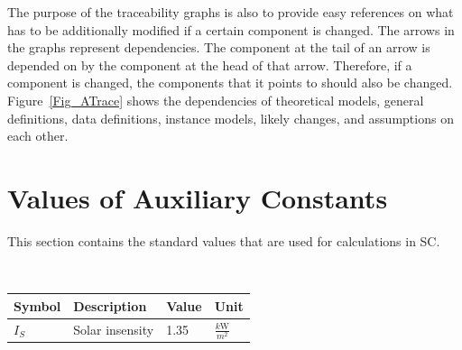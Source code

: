 \documentclass[12pt]{article}
\begin{document}
The purpose of the traceability graphs is also to provide easy references on
what has to be additionally modified if a certain component is changed.  The
arrows in the graphs represent dependencies. The component at the tail of an
arrow is depended on by the component at the head of that arrow. Therefore, if a
component is changed, the components that it points to should also be
changed. Figure~\ref{Fig_ATrace} shows the dependencies of theoretical models,
general definitions, data definitions, instance models, likely changes, and
assumptions on each other. 




\section{Values of Auxiliary Constants}\label{sec_VAC}

This section contains the standard values that are used for calculations in SC.


~\newline

\renewcommand{\arraystretch}{1.2}

  \noindent \begin{tabular}{l l l l} 
    \toprule		
    \textbf{Symbol} & \textbf{Description} & \textbf{Value}& \textbf{Unit}\\
    \midrule 
    $I_{S}$ & Solar insensity &1.35 & $\frac{k\si\watt}{m^2}$ \\
 
    \bottomrule
  \end{tabular}
\end{document}
